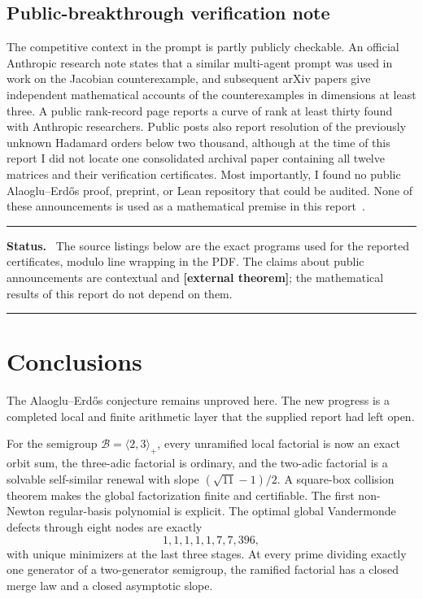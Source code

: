 \documentclass[11pt,oneside]{article}
\theoremstyle{definition}
\theoremstyle{remark}
\newcommand{\B}{\mathcal B}
\newcommand{\statusexternal}{\textcolor{quietgray}{\textbf{[external theorem]}}}
\newenvironment{statusbox}
{\begin{center}\begin{minipage}{0.94\textwidth}\raggedright\hrule
\vspace{0.42em}\textbf{Status.}\ }
{\par\vspace{0.32em}\hrule\end{minipage}\end{center}}
\begin{document}
\subsection{Public-breakthrough verification note}

The competitive context in the prompt is partly publicly checkable.  An official Anthropic
research note states that a similar multi-agent prompt was used in work on the Jacobian
counterexample, and subsequent arXiv papers give independent mathematical accounts of the
counterexamples in dimensions at least three.  A public rank-record page reports a curve of
rank at least thirty found with Anthropic researchers.  Public posts also report resolution of
the previously unknown Hadamard orders below two thousand, although at the time of this report
I did not locate one consolidated archival paper containing all twelve matrices and their
verification certificates.  Most importantly, I found no public Alaoglu--Erd\H{o}s proof,
preprint, or Lean repository that could be audited.  None of these announcements is used as a
mathematical premise in this report~\cite{AnthropicMath2026,Gao2026,Rank30,HadamardPosts}.

\begin{statusbox}
The source listings below are the exact programs used for the reported certificates, modulo
line wrapping in the PDF.  The claims about public announcements are contextual and
\statusexternal; the mathematical results of this report do not depend on them.
\end{statusbox}

\section{Conclusions}
\label{sec:conclusion}

The Alaoglu--Erd\H{o}s conjecture remains unproved here.  The new progress is a completed local
and finite arithmetic layer that the supplied report had left open.

For the semigroup \(\B=\langle2,3\rangle_+\), every unramified local factorial is now an exact
orbit sum, the three-adic factorial is ordinary, and the two-adic factorial is a solvable
self-similar renewal with slope \((\sqrt{11}-1)/2\).  A square-box collision theorem makes the
global factorization finite and certifiable.  The first non-Newton regular-basis polynomial is
explicit.  The optimal global Vandermonde defects through eight nodes are exactly
\[
 1,1,1,1,1,7,7,396,
\]
with unique minimizers at the last three stages.  At every prime dividing exactly one generator
of a two-generator semigroup, the ramified factorial has a closed merge law and a closed
asymptotic slope.
\end{document}
